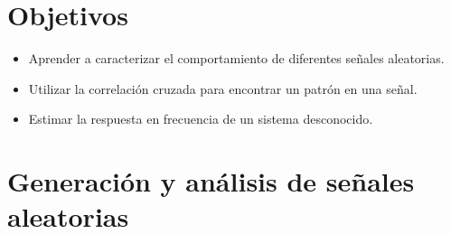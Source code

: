 \documentclass[10pt,twoside,spanish,a4paper]{article}
\begin{document}
\vspace{-8em}

\section*{Objetivos}

\begin{itemize}
	\item Aprender a caracterizar el comportamiento de diferentes señales aleatorias.
	\item Utilizar la correlación cruzada para encontrar un patrón en una señal.
	\item Estimar la respuesta en frecuencia de un sistema desconocido.
\end{itemize}

\section*{Generación y análisis de señales aleatorias}
\end{document}
